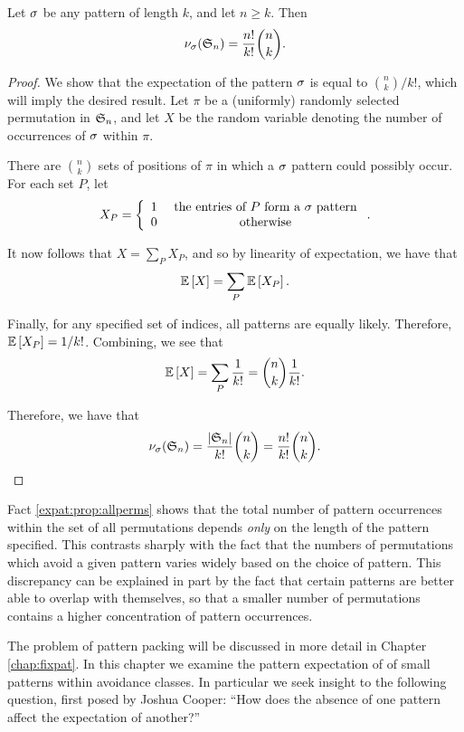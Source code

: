     \begin{proposition} \label{expat:prop:allperms}
      Let $\sg$ be any pattern of length $k$, and let $n \geq k$.  Then 
      $$ \num_\sg(\S_n) = \frac{n!}{k!} \binom{n}{k}.$$
    \end{proposition}
    \begin{proof}
      We show that the expectation of the pattern $\sg$ is equal to 
      $\binom{n}{k}/k!$, which will imply the desired result. 
      Let $\pi$ be a (uniformly) randomly selected permutation in $\S_n$, and let
      $X$ be the random variable denoting the number of occurrences of $\sg$
      within $\pi$. 

      There are $\binom{n}{k}$ sets of positions of $\pi$ in which a $\sg$
      pattern could possibly occur. For each set $P$, let 
      $$ X_P = \left\{ \begin{array}{cc} 
                1 & \text{ the entries of $P$ form a $\sg$ pattern} \\
                0 & \text{ otherwise} 
              \end{array}\right..
      $$

      It now follows that $X = \sum_{P} X_P$, and so by linearity of expectation,
      we have that 
      $$ \Ex{X} = \sum_P \Ex{X_P}.$$

      Finally, for any specified set of indices, all patterns are equally likely.
      Therefore, $\Ex{X_P} = 1 / k!$. Combining, we see that 
      $$ \Ex{X} = \sum_P \frac{1}{k!} = \binom{n}{k}\frac{1}{k!}. $$

      Therefore, we have that 
      $$\num_\sg(\S_n) = \frac{|\S_n|}{k!} \binom{n}{k} =
      \frac{n!}{k!} \binom{n}{k}.$$
    \end{proof}

    Fact \ref{expat:prop:allperms} shows that the total number of pattern occurrences
    within the set of all permutations depends \emph{only} on the length of the
    pattern specified. This contrasts sharply with the fact that the numbers of
    permutations which avoid a given pattern varies widely based on the choice of
    pattern. This discrepancy can be explained in part by the fact that certain
    patterns are better able to overlap with themselves, so that a smaller number
    of permutations contains a higher concentration of pattern occurrences. 
    
    The problem of pattern packing will be discussed in more detail in Chapter
    \ref{chap:fixpat}. In this chapter we examine the pattern expectation of
    of small patterns within avoidance classes. In particular we seek insight to
    the following question, first posed by Joshua Cooper: ``How does the absence
    of one pattern affect the expectation of another?''

